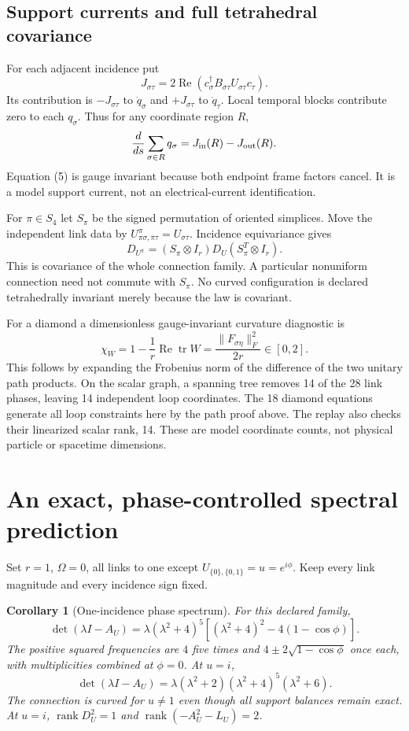 \documentclass[11pt,a4paper]{article}
\newtheorem{corollary}[theorem]{Corollary}
\newcommand{\tr}{\operatorname{tr}}
\newcommand{\rank}{\operatorname{rank}}
\newcommand{\ad}{\dagger}
\begin{document}
\subsection{Support currents and full tetrahedral covariance}
For each adjacent incidence put
\[
 J_{\sigma\tau}
 =2\operatorname{Re}
     (c_\sigma^\ad B_{\sigma\tau}U_{\sigma\tau}c_\tau).       \tag{5}
\]
Its contribution is $-J_{\sigma\tau}$ to $\dot q_\sigma$ and
$+J_{\sigma\tau}$ to $\dot q_\tau$. Local temporal blocks contribute
zero to each $q_\sigma$. Thus for any coordinate region $R$,
\[
 \frac{d}{ds}\sum_{\sigma\in R}q_\sigma
 =J_{\rm in}(R)-J_{\rm out}(R).
\]
Equation (5) is gauge invariant because both endpoint frame factors
cancel. It is a model support current, not an electrical-current
identification.

For $\pi\in S_4$ let $S_\pi$ be the signed permutation of oriented
simplices. Move the independent link data by
$U^\pi_{\pi\sigma,\pi\tau}=U_{\sigma\tau}$.
Incidence equivariance gives
\[
 D_{U^\pi}=(S_\pi\otimes I_r)D_U(S_\pi^T\otimes I_r).       \tag{6}
\]
This is covariance of the whole connection family. A particular
nonuniform connection need not commute with $S_\pi$. No curved
configuration is declared tetrahedrally invariant merely because
the law is covariant.

For a diamond a dimensionless gauge-invariant curvature diagnostic is
\[
 \chi_W=1-\frac1r\operatorname{Re}\tr W
       =\frac{\|F_{\sigma\eta}\|_F^2}{2r}\in[0,2].           \tag{7}
\]
This follows by expanding the Frobenius norm of the difference of
the two unitary path products. On the scalar graph, a spanning tree
removes 14 of the 28 link phases, leaving 14 independent loop
coordinates. The 18 diamond equations generate all loop constraints
here by the path proof above. The replay also checks their
linearized scalar rank, 14. These are model coordinate counts,
not physical particle or spacetime dimensions.

\section{An exact, phase-controlled spectral prediction}
Set $r=1$, $\Omega=0$, all links to one except
$U_{\{0\},\{0,1\}}=u=e^{i\phi}$. Keep every link magnitude and every
incidence sign fixed.

\begin{corollary}[One-incidence phase spectrum]\label{cor:phase}
For this declared family,
\[
 \det(\lambda I-A_U)
 =\lambda(\lambda^2+4)^5
   \left[(\lambda^2+4)^2-4(1-\cos\phi)\right].              \tag{8}
\]
The positive squared frequencies are $4$ five times and
$4\pm2\sqrt{1-\cos\phi}$ once each, with multiplicities combined
at $\phi=0$. At $u=i$,
\[
 \det(\lambda I-A_U)
 =\lambda(\lambda^2+2)(\lambda^2+4)^5(\lambda^2+6).         \tag{9}
\]
The connection is curved for $u\ne1$ even though all support balances
remain exact. At $u=i$, $\rank D_U^2=1$ and
$\rank(-A_U^2-L_U)=2$.
\end{corollary}
\end{document}
